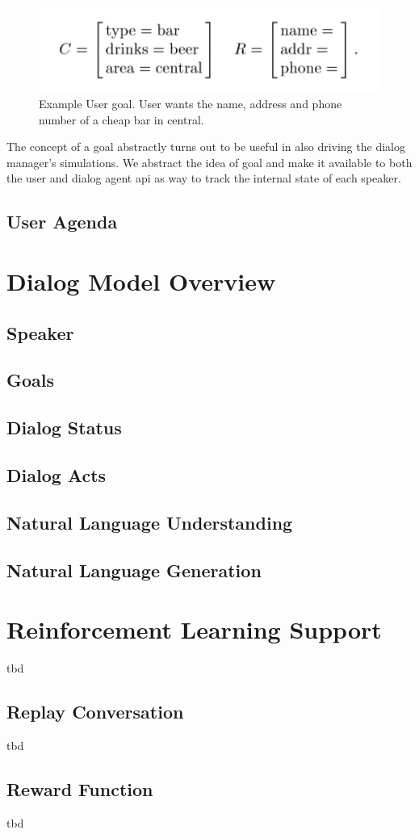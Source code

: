 \begin{figure}[h!]
	\includegraphics[width=\linewidth]{diagrams/schatzmann_goal_fig.jpeg}
	\caption{Example User goal. User wants the name, address and phone number of a cheap bar in central.  }
	\label{fig:goals1}
\end{figure}

The concept of a goal abstractly turns out to be useful in also driving the dialog manager's simulations. We abstract the idea of goal and make it available to both the user and dialog agent api as way to track the internal state of each speaker. 

\subsection{User Agenda} 







\section{Dialog Model Overview}

\subsection{Speaker}
\subsection{Goals}
\subsection{Dialog Status}
\subsection{Dialog Acts}
\subsection{Natural Language Understanding}
\subsection{Natural Language Generation}


\section{Reinforcement Learning Support}
tbd
\subsection{Replay Conversation}
tbd
\subsection{Reward Function}
tbd

